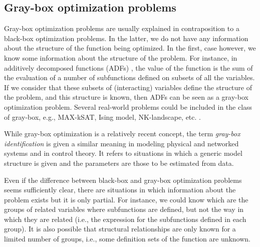 \documentclass{article} %
\begin{document}

  
  

 \subsection{Gray-box optimization problems}


      Gray-box optimization problems are  usually explained in contraposition to a black-box optimization problems. In the latter, we do not have any information about the structure of the function being optimized. In the first, case however, we know some information about the structure of the problem. For instance, in additively decomposed functions (ADFs) \cite{Muhlenbein_et_al:1999},  the value of the function is the  sum of the evaluation of a number of subfunctions defined on subsets of all the variables. If we consider that these subsets of (interacting) variables define the structure of the problem, and this structure is known, then ADFs can be seen as a gray-box optimization problem. Several real-world problems could be included in the class of  gray-box, e.g., MAX-kSAT, Ising model, NK-landscape, etc. \cite{Whitley:2015}. 

While gray-box optimization is a relatively recent concept, the term  \emph{gray-box identification} \cite{Pearson_and_Pottman:2000} is given a similar meaning in modeling physical and networked systems and in control theory.  It refers to situations in which a generic model structure is given and the parameters are those to be estimated from data.  


  
Even if the difference between black-box and gray-box optimization problems seems sufficiently clear, there are situations in which information about the problem exists but it is only partial. For instance, we could know which are the groups of related variables where subfunctions are defined, but not the way in which they are related (i.e., the expression for the subfunctions defined in each group).  It is also possible that structural relationships are only known for a limited number of groups, i.e., some definition sets of the function are unknown.
\end{document}
